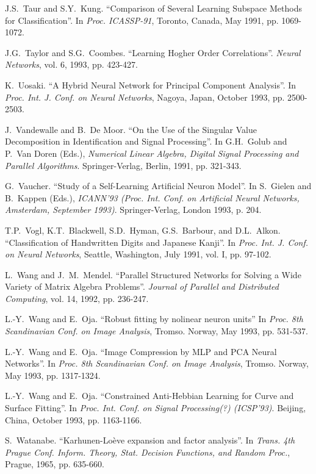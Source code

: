 \begin{thebibliography}{999}
J.S.~Taur and S.Y.~Kung.
``Comparison of Several Learning Subspace Methods for
Classification''.
In {\em Proc. ICASSP-91}, Toronto, Canada, May 1991, pp. 1069-1072.

J.G.~Taylor and S.G.~Coombes.
``Learning Hogher Order Correlations''.
{\em Neural Networks}, vol. 6, 1993, pp. 423-427.

K.~Uosaki.
``A Hybrid Neural Network for Principal Component Analysis''.
In {\em Proc. Int. J. Conf. on Neural Networks}, Nagoya, Japan,
October 1993, pp. 2500-2503.
 
J.~Vandewalle and B.~De Moor.
``On the Use of the Singular Value Decomposition in Identification
and Signal Processing''.
In G.H.~Golub and P.~Van Doren (Eds.), {\em Numerical Linear Algebra,
Digital Signal Processing and Parallel Algorithms}. Springer-Verlag, 
Berlin, 1991, pp. 321-343.
 
G.~Vaucher.
``Study of a Self-Learning Artificial Neuron Model''.
In S.~Gielen and B.~Kappen (Eds.), {\em ICANN'93 (Proc. Int. Conf.
on Artificial Neural Networks, Amsterdam, September 1993)}.
Springer-Verlag, London 1993, p. 204.

T.P.~Vogl, K.T.~Blackwell, S.D.~Hyman, G.S.~Barbour, and D.L.~Alkon.
``Classification of Handwritten Digits and Japanese Kanji''.
In {\em Proc. Int. J. Conf. on Neural Networks}, Seattle, Washington,
July 1991, vol. I, pp. 97-102.
 
L.~Wang and J.~M.~Mendel.
``Parallel Structured Networks for Solving a Wide Variety
of Matrix Algebra Problems''.
{\em Journal of Parallel and Distributed Computing}, vol. 14, 1992,
pp. 236-247.

L.-Y.~Wang and E.~Oja.
``Robust fitting by nolinear neuron units''
In {\em Proc. 8th Scandinavian Conf. on Image Analysis}, Tromso.
Norway, May 1993, pp. 531-537.

L.-Y.~Wang and E.~Oja.
``Image Compression by MLP and PCA Neural Networks''.
In {\em Proc. 8th Scandinavian Conf. on Image Analysis}, Tromso.
Norway, May 1993, pp. 1317-1324.

L.-Y.~Wang and E.~Oja.
``Constrained Anti-Hebbian Learning for Curve and Surface Fitting''.
In {\em Proc. Int. Conf. on Signal Processing(?) (ICSP'93)}. Beijing, China, 
October 1993, pp. 1163-1166.

S.~Watanabe.
``Karhunen-Lo\`{e}ve expansion and factor analysis''.
In {\em Trans. 4th Prague Conf. Inform. Theory, Stat. Decision
Functions, and Random Proc.}, Prague, 1965, pp. 635-660.


\end{thebibliography}

